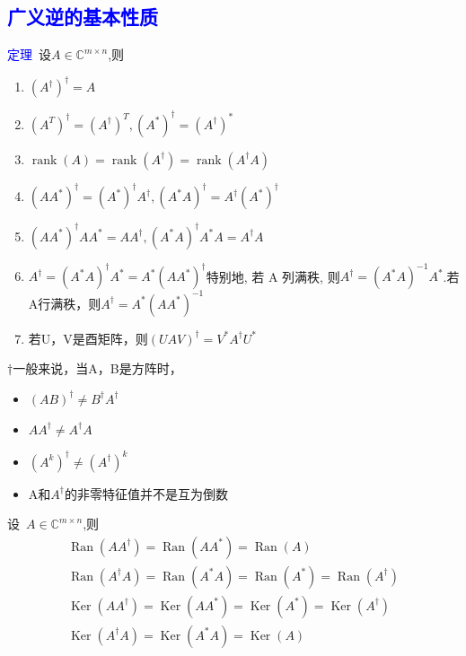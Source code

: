 \documentclass[12pt,a4paper]{article}
\begin{document}
\subsection{\textcolor{blue}{广义逆的基本性质}}
\noindent \textcolor{blue}{定理}~设$A \in \mathbb{C}^{m \times n}$,则\begin{enumerate}[(1)]
\item $(A^{\dagger})^{\dagger}=A$
\item $(A^{T})^{\dagger}=(A^{\dagger})^{T},(A^{*})^{\dagger}=(A^{\dagger})^{*}$
\item $\operatorname{rank}(A)=\operatorname{rank}\left(A^{\dagger}\right)=\operatorname{rank}\left(A^{\dagger} A\right)$
\item $\left(A A^{*}\right)^{\dagger}=\left(A^{*}\right)^{\dagger} A^{\dagger},\left(A^{*} A\right)^{\dagger}=A^{\dagger}\left(A^{*}\right)^{\dagger}$
\item $\left(A A^{*}\right)^{\dagger} A A^{*}=A A^{\dagger},\left(A^{*} A\right)^{\dagger} A^{*} A=A^{\dagger} A$
\item $A^{\dagger}=\left(A^{*} A\right)^{\dagger} A^{*}=A^{*}\left(A A^{*}\right)^{\dagger}$特别地, 若 A 列满秩, 则$A^{\dagger}=\left(A^{*} A\right)^{-1} A^{*}$.若A行满秩，则$A^{\dagger}=A^{*}\left(A A^{*}\right)^{-1}$
\item 若U，V是酉矩阵，则$(U A V)^{\dagger}=V^{*} A^{\dagger} U^{*}$
\end{enumerate}
$\dagger$一般来说，当A，B是方阵时，
\begin{itemize}
\item $(A B)^{\dagger} \neq B^{\dagger} A^{\dagger}$
\item $A A^{\dagger} \neq A^{\dagger} A$
\item $\left(A^{k}\right)^{\dagger} \neq\left(A^{\dagger}\right)^{k}$
\item A和$A^{\dagger}$的非零特征值并不是互为倒数
\end{itemize}
设~$A \in \mathbb{C}^{m \times n}$,则
$$
\begin{array}{l}{\operatorname{Ran}\left(A A^{\dagger}\right)=\operatorname{Ran}\left(A A^{*}\right)=\operatorname{Ran}(A)} \\ {\operatorname{Ran}\left(A^{\dagger} A\right)=\operatorname{Ran}\left(A^{*} A\right)=\operatorname{Ran}\left(A^{*}\right)=\operatorname{Ran}\left(A^{\dagger}\right)} \\ {\operatorname{Ker}\left(A A^{\dagger}\right)=\operatorname{Ker}\left(A A^{*}\right)=\operatorname{Ker}\left(A^{*}\right)=\operatorname{Ker}\left(A^{\dagger}\right)} \\ {\operatorname{Ker}\left(A^{\dagger} A\right)=\operatorname{Ker}\left(A^{*} A\right)=\operatorname{Ker}(A)}\end{array}
$$
\end{document}
